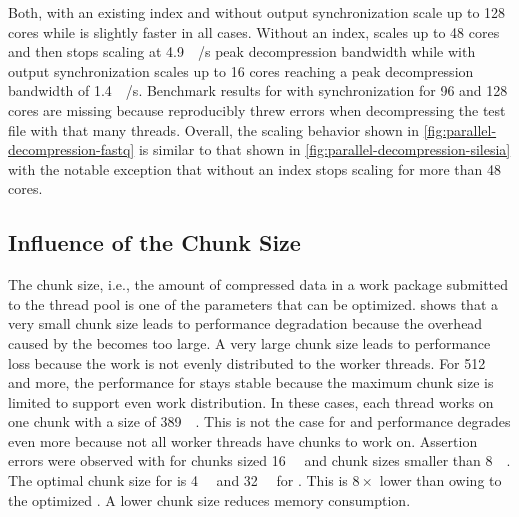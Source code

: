 Both, \pragzip with an existing index and \pugz without output synchronization scale up to 128 cores while \pragzip is slightly faster in all cases.
Without an index, \pragzip scales up to \num{48} cores and then stops scaling at \SI{4.9}{\giga\byte/\second} peak decompression bandwidth while \pugz with output synchronization scales up to 16 cores reaching a peak decompression bandwidth of \SI{1.4}{\giga\byte/\second}.
Benchmark results for \pugz with synchronization for \num{96} and \num{128} cores are missing because \pugz reproducibly threw errors when decompressing the test file with that many threads.
Overall, the scaling behavior shown in \cref{fig:parallel-decompression-fastq} is similar to that shown in \cref{fig:parallel-decompression-silesia} with the notable exception that \pragzip without an index stops scaling for more than \num{48} cores.


\subsection{Influence of the Chunk Size}

The chunk size, i.e., the amount of compressed data in a work package submitted to the thread pool is one of the parameters that can be optimized.
 shows that a very small chunk size leads to performance degradation because the overhead caused by the \blockfinder becomes too large.
A very large chunk size leads to performance loss because the work is not evenly distributed to the worker threads.
For \SI{512}{\mebi\byte} and more, the performance for \pugz stays stable because the maximum chunk size is limited to support even work distribution.
In these cases, each thread works on one chunk with a size of \SI{389}{\mebi\byte}.
This is not the case for \pragzip and performance degrades even more because not all worker threads have chunks to work on.
Assertion errors were observed with \pugz for chunks sized \SI{16}{\mebi\byte} and chunk sizes smaller than \SI{8}{\mebi\byte}.
The optimal chunk size for \pragzip is \SI{4}{\mebi\byte} and \SI{32}{\mebi\byte} for \pugz.
This is $8\times$ lower than \pugz owing to the optimized \blockfinder.
A lower chunk size reduces memory consumption.

